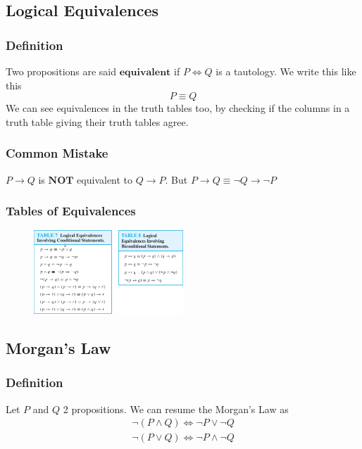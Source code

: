 \documentclass{article}
\begin{document}
\subsection{Logical Equivalences}
\subsubsection{Definition}
Two propositions are said $ \textbf{equivalent} $ if $ P \Leftrightarrow Q $ is a tautology. We write this like this
\begin{equation}
P \equiv Q
\end{equation}
We can see equivalences in the truth tables too, by checking if the columns in a truth table giving their truth tables agree.

\subsubsection{Common Mistake}
\begin{tcolorbox}[width=12.1cm, leftrule=3mm]
$ P \rightarrow Q $ is $ \textbf{NOT} $ equivalent to $ Q \rightarrow P $. But $ P \rightarrow Q \equiv \neg Q \rightarrow \neg P $
\end{tcolorbox}

\subsubsection{Tables of Equivalences}
\begin{figure}[h]
  \hfill\includegraphics[width=0.5\textwidth]{equiv.png}\hspace*{\fill}
  \label{fig:equiv}
\end{figure}  

\subsection{Morgan's Law}
\subsubsection{Definition} 
Let $ P $ and $ Q $ 2 propositions. We can resume the Morgan's Law as
\begin{align}
\neg (P \wedge Q) \Leftrightarrow \neg P \vee \neg Q\\
\neg (P \vee Q) \Leftrightarrow \neg P \wedge \neg Q
\end{align}
\end{document}
